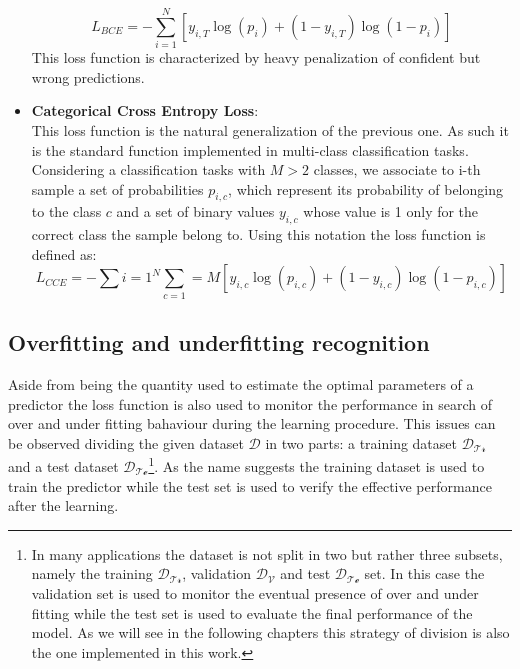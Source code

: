 \begin{itemize}
    \begin{equation}
        L_{BCE}= -\sum_{i=1}^N\left[ y_{i,T}\log(p_i)+
        \left(1- y_{i,T}\right)\log(1-p_i)\right]
    \end{equation}
    This loss function is characterized by heavy penalization of confident but wrong predictions. 
\item \textbf{Categorical Cross Entropy Loss}:\\
    This loss function is the natural generalization of the previous one. As such it is the standard function implemented in multi-class classification tasks. Considering a classification tasks with $M>2$ classes, we associate to i-th sample a set of probabilities $p_{i,c}$, which represent its probability of belonging to the class $c$ and a set of binary values $y_{i,c}$ whose value is 1 only for the correct class the sample belong to. Using this notation the loss function is defined as:
    \begin{equation}
        L_{CCE} = -\sum{i=1}^N \sum_{c=1}=M  \left[
        y_{i,c}\log(p_{i,c}) + (1-y_{i,c})\log(1-p_{i,c})
        \right]
    \end{equation}
\end{itemize}


\subsection{Overfitting and underfitting recognition} \label{fit_over_under}

Aside from being the quantity used to estimate the optimal parameters of a predictor the loss function is also used to monitor the performance in search of over and under fitting bahaviour during the learning procedure. 
This issues can be observed dividing the given dataset $\mathcal{D}$ in two parts: a training dataset $\mathcal{D_{Tr}}$ and a test dataset $\mathcal{D_{Te}}$\footnote{In many applications the dataset is not split in two but rather three subsets, namely the training $\mathcal{D_{Tr}}$, validation $\mathcal{D_{V}}$ and test $\mathcal{D_{Te}}$ set. In this case the validation set is used to monitor the eventual presence of over and under fitting while the test set is used to evaluate the final performance of the model. As we will see in the following chapters this strategy of division is also the one implemented in this work.}. As the name suggests the training dataset is used to train the predictor while the test set is used to verify the effective performance after the learning.

